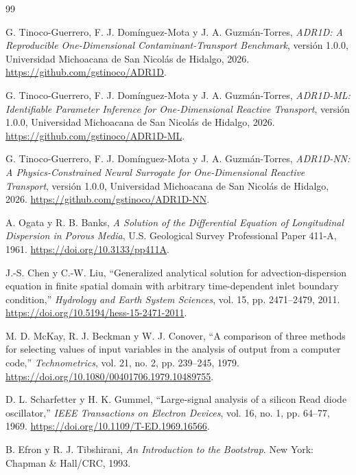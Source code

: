 \documentclass[11pt,a4paper]{article}
\begin{document}
\clearpage
\begingroup
\footnotesize
\setlength{\parskip}{0pt}
\begin{thebibliography}{99}
\setlength{\itemsep}{2pt}
\setlength{\parsep}{0pt}

G. Tinoco-Guerrero, F. J. Domínguez-Mota y J. A. Guzmán-Torres,
\emph{ADR1D: A Reproducible One-Dimensional Contaminant-Transport Benchmark},
versión 1.0.0, Universidad Michoacana de San Nicolás de Hidalgo, 2026.
\url{https://github.com/gstinoco/ADR1D}.

G. Tinoco-Guerrero, F. J. Domínguez-Mota y J. A. Guzmán-Torres,
\emph{ADR1D-ML: Identifiable Parameter Inference for One-Dimensional Reactive
Transport}, versión 1.0.0, Universidad Michoacana de San Nicolás de Hidalgo,
2026. \url{https://github.com/gstinoco/ADR1D-ML}.

G. Tinoco-Guerrero, F. J. Domínguez-Mota y J. A. Guzmán-Torres,
\emph{ADR1D-NN: A Physics-Constrained Neural Surrogate for One-Dimensional
Reactive Transport}, versión 1.0.0, Universidad Michoacana de San Nicolás de
Hidalgo, 2026. \url{https://github.com/gstinoco/ADR1D-NN}.

A. Ogata y R. B. Banks, \emph{A Solution of the Differential Equation of
Longitudinal Dispersion in Porous Media}, U.S. Geological Survey Professional
Paper 411-A, 1961. \url{https://doi.org/10.3133/pp411A}.

J.-S. Chen y C.-W. Liu, ``Generalized analytical solution for
advection-dispersion equation in finite spatial domain with arbitrary
time-dependent inlet boundary condition,'' \emph{Hydrology and Earth System
Sciences}, vol. 15, pp. 2471--2479, 2011.
\url{https://doi.org/10.5194/hess-15-2471-2011}.

M. D. McKay, R. J. Beckman y W. J. Conover, ``A comparison of three methods for
selecting values of input variables in the analysis of output from a computer
code,'' \emph{Technometrics}, vol. 21, no. 2, pp. 239--245, 1979.
\url{https://doi.org/10.1080/00401706.1979.10489755}.

D. L. Scharfetter y H. K. Gummel, ``Large-signal analysis of a silicon Read
diode oscillator,'' \emph{IEEE Transactions on Electron Devices}, vol. 16,
no. 1, pp. 64--77, 1969.
\url{https://doi.org/10.1109/T-ED.1969.16566}.

B. Efron y R. J. Tibshirani, \emph{An Introduction to the Bootstrap}.
New York: Chapman \& Hall/CRC, 1993.

\end{thebibliography}
\endgroup
\end{document}
